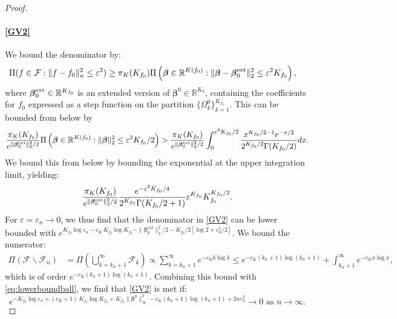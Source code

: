 \documentclass{article}
\newcommand{\1}{\mathbb{I}}
\newcommand{\e}{\varepsilon}
\newcommand{\bm}[1]{\boldsymbol{#1}}
\def\b{\bm{\beta}}
\def\b{\bm{\beta}}
\theoremstyle{assumption}
\begin{document}
\begin{proof}
\paragraph{\ref{GV2}}
 We  bound the denominator by:
\begin{align*}
\Pi(f \in \mathcal{F} : \|f-f_0\|_n^2 \leq \e^2)
&\geq \pi_K(K_{f_0})\Pi\left(\b \in \mathbb{R}^{{K(f_0)}} : \|\b - \b^{\rm ext}_0\|_2^2 \leq \e^2 K_{f_0} \right),
\end{align*}
where $\b_0^{\rm ext} \in \mathbb{R}^{K_{f_0}}$ is an extended version of $\b^0 \in \mathbb{R}^{K_0}$, containing the coefficients for $f_0$ expressed as a step function on the partition $\{\Omega_k^0\}_{k=1}^{K_{f_0}}$. This can be bounded from below by
\begin{equation*}
\frac{\pi_K(K_{f_0})}{e^{\|\b^{\rm ext}_0\|_2^2/2}}\Pi\left(\b \in \mathbb{R}^{{K(f_0)}}:\|\b\|^2_2\leq  \e^2 K_{f_0}/2\right)> \frac{\pi_K(K_{f_0})}{e^{\|\b^{\rm ext}_0\|_2^2/2}} \int_0^{\e^2 K_{f_0}/2} 
\frac{x^{K_{f_0}/2 -1} e^{-x/2}}{2^{K_{f_0}/2}\Gamma(K_{f_0}/2)}dx.
\end{equation*}
We bound this from below by bounding the exponential at the upper integration limit, yielding:
\begin{equation}\label{eq:lowerboundball}
 \frac{\pi_K(K_{f_0})}{e^{\|\b^{\rm ext}_0\|_2^2/2}}\frac{e^{-\varepsilon^2K_{f_0}/4}}{2^{K_{f_0}}\Gamma(K_{f_0}/2+1)}\varepsilon^{K_{f_0}}K_{f_0}^{K_{f_0}/2}. 
\end{equation}
For $\e = \e_n \to 0$, we thus find that the denominator in  \ref{GV2} can be lower bounded with $e^{K_{f_0}\log \e_n-c_K\,K_{f_0}\log K_{f_0}-\|\b_0^{ext}\|^2_2/2-K_{f_0}/2[\log 2+\e_n^2/2]}$. We bound the numerator:
\begin{align*}
\Pi(\mathcal{F} \backslash \mathcal{F}_n) &= \Pi\left( \bigcup_{k = k_n + 1}^\infty \mathcal{F}_k \right)
\propto \sum_{k=k_n + 1}^\infty e^{-c_Kk\log{k}}
\leq e^{-c_K(k_n+1)\log(k_n+1)} + \int_{k_n + 1}^\infty e^{-c_Kx\log{x}},
\end{align*}
which is of order {$e^{-c_K(k_n+1)\log(k_n+1)}$}. 
Combining this bound with \eqref{eq:lowerboundball}, we find that \ref{GV2} is met if:
\begin{equation*}
e^{-K_{f_0}\log{\e_n}+(c_K+1)\,K_{f_0}\log K_{f_0}+K_{f_0}\|\b^0\|_\infty^2 - c_K(k_n+1)\log(k_n+1) + 2n\e_n^2} \to 0 \text{ as } n \to \infty.
\end{equation*}




\end{proof}
\end{document}
